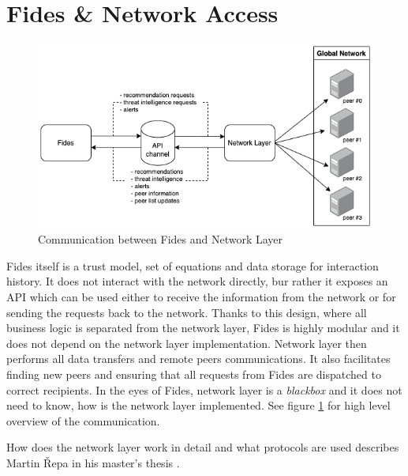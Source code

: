 \section{Fides \& Network Access}
\label{sec:fides-and-network-access}

\begin{figure}[ht]
    \centering
    \includegraphics[width=1.0\textwidth]{assets/tl_api_nl.png}
    \caption{Communication between Fides and Network Layer}
    \label{fig:fides-api-network}
\end{figure}

Fides itself is a trust model, set of equations and data storage for interaction history. 
It does not interact with the network directly, bur rather it exposes an API which can be used either to receive the information from the network or for sending the requests back to the network.
Thanks to this design, where all business logic is separated from the network layer, Fides is highly modular and it does not depend on the network layer implementation.
Network layer then performs all data transfers and remote peers communications.
It also facilitates finding new peers and ensuring that all requests from Fides are dispatched to correct recipients.
In the eyes of Fides, network layer is a \textit{blackbox} and it does not need to know, how is the network layer implemented.
See figure \ref{fig:fides-api-network} for high level overview of the communication.

How does the network layer work in detail and what protocols are used describes Martin Řepa in his master's thesis \cite{nl}.